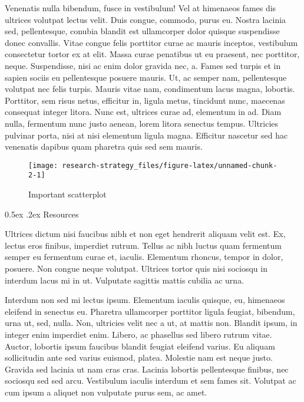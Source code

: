 \documentclass[11pt,]{article}
\makeatletter
\renewcommand\subsubsection{
  \@startsection{subsubsection}{3}{\z@}
    {-1.0ex\@plus -1ex \@minus -.2ex}%
    {0.5ex \@plus .2ex}%
    {\normalfont\normalsize\bf}} %
\makeatother
\begin{document}
Venenatis nulla bibendum, fusce in vestibulum! Vel at himenaeos fames
dis ultrices volutpat lectus velit. Duis congue, commodo, purus eu.
Nostra lacinia sed, pellentesque, conubia blandit est ullamcorper dolor
quisque suspendisse donec convallis. Vitae congue felis porttitor curae
ac mauris inceptos, vestibulum consectetur tortor ex at elit. Massa
curae penatibus ut eu praesent, nec porttitor, neque. Suspendisse, nisi
ac enim dolor gravida nec, a. Fames sed turpis et in sapien sociis eu
pellentesque posuere mauris. Ut, ac semper nam, pellentesque volutpat
nec felis turpis. Mauris vitae nam, condimentum lacus magna, lobortis.
Porttitor, sem risus netus, efficitur in, ligula metus, tincidunt nunc,
maecenas consequat integer litora. Nunc est, ultrices curae ad,
elementum in ad. Diam nulla, fermentum nunc justo aenean, lorem litora
senectus tempus. Ultricies pulvinar porta, nisi at nisi elementum ligula
magna. Efficitur nascetur sed hac venenatis dapibus quam pharetra quis
sed sem mauris.

\begin{wrapfigure}{R}{0.3\textwidth}

\hfill{}\texttt{[image: research-strategy\_files/figure-latex/unnamed-chunk-2-1]} 

\caption{Important scatterplot}\label{fig:unnamed-chunk-2}
\end{wrapfigure}

\hypertarget{resources}{%
\subsubsection{Resources}\label{resources}}

Ultrices dictum nisi faucibus nibh et non eget hendrerit aliquam velit
est. Ex, lectus eros finibus, imperdiet rutrum. Tellus ac nibh luctus
quam fermentum semper eu fermentum curae et, iaculis. Elementum rhoncus,
tempor in dolor, posuere. Non congue neque volutpat. Ultrices tortor
quis nisi sociosqu in interdum lacus mi in ut. Vulputate sagittis mattis
cubilia ac urna.

Interdum non sed mi lectus ipsum. Elementum iaculis quisque, eu,
himenaeos eleifend in senectus eu. Pharetra ullamcorper porttitor ligula
feugiat, bibendum, urna ut, sed, nulla. Non, ultricies velit nec a ut,
at mattis non. Blandit ipsum, in integer enim imperdiet enim. Libero, ac
phasellus sed libero rutrum vitae. Auctor, lobortis ipsum faucibus
blandit feugiat eleifend varius. Eu aliquam sollicitudin ante sed varius
euismod, platea. Molestie nam est neque justo. Gravida sed lacinia ut
nam cras cras. Lacinia lobortis pellentesque finibus, nec sociosqu sed
sed arcu. Vestibulum iaculis interdum et sem fames sit. Volutpat ac cum
ipsum a aliquet non vulputate purus sem, ac amet.
\end{document}
